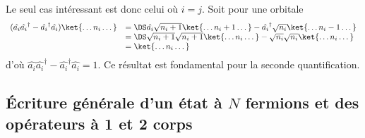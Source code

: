Le seul cas intéressant est donc celui où $i=j$. Soit pour une orbitale
\begin{equation}
\begin{array}{ll}
(\hat{a_i}\hat{a_i}^\dagger -\hat{a_i}^\dagger\hat{a_i})\ket{\dots n_i\dots} &=\DS \hat{a_i}\sqrt{n_i+1}\ket{\dots n_i+1\dots}-
\hat{a_i}^\dagger\sqrt{n_i}\ket{\dots n_i-1\dots}\\
&=\DS \sqrt{n_i+1}\sqrt{n_i+1}\ket{\dots n_i\dots}-\sqrt{n_i}\sqrt{n_i}\ket{\dots n_i\dots}\\
&=\ket{\dots n_i\dots}
\end{array}
\end{equation}
d'où $\hat{a_i}\hat{a_i}^\dagger -\hat{a_i}^\dagger\hat{a_i} = \hat{1}$. Ce résultat est fondamental pour la seconde quantification.





\subsection{Écriture générale d'un état à $N$ fermions et des opérateurs à 1 et 2 corps}